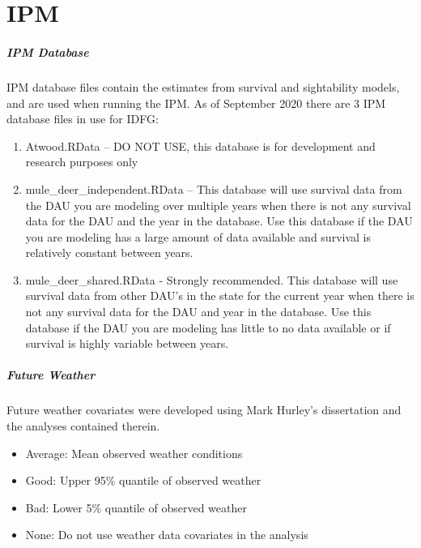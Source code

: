 \documentclass[
]{book}
\providecommand{\tightlist}{%
  \setlength{\itemsep}{0pt}\setlength{\parskip}{0pt}}
\begin{document}
\hypertarget{gl-ipm}{%
\section{IPM}\label{gl-ipm}}

\hypertarget{gl-ipm-db}{%
\subparagraph*{IPM Database}\label{gl-ipm-db}}

IPM database files contain the estimates from survival and sightability models, and are used when running the IPM. As of September 2020 there are 3 IPM database files in use for IDFG:

\begin{enumerate}
\def\labelenumi{\arabic{enumi}.}
\tightlist
\item
  Atwood.RData -- DO NOT USE, this database is for development and research purposes only
\item
  mule\_deer\_independent.RData -- This database will use survival data from the DAU you are modeling over multiple years when there is not any survival data for the DAU and the year in the database. Use this database if the DAU you are modeling has a large amount of data available and survival is relatively constant between years.
\item
  mule\_deer\_shared.RData - Strongly recommended. This database will use survival data from other DAU's in the state for the current year when there is not any survival data for the DAU and year in the database. Use this database if the DAU you are modeling has little to no data available or if survival is highly variable between years.
\end{enumerate}

\hypertarget{gl-ipm-weather}{%
\subparagraph*{Future Weather}\label{gl-ipm-weather}}

Future weather covariates were developed using Mark Hurley's dissertation and the analyses contained therein.

\begin{itemize}
\tightlist
\item
  Average: Mean observed weather conditions
\item
  Good: Upper 95\% quantile of observed weather
\item
  Bad: Lower 5\% quantile of observed weather
\item
  None: Do not use weather data covariates in the analysis
\end{itemize}
\end{document}
